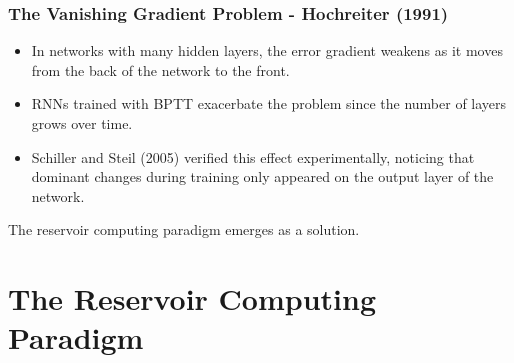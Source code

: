 \documentclass{beamer}
\begin{document}

\begin{frame}
\frametitle{The Vanishing Gradient Problem - Hochreiter (1991)}

\begin{itemize}
\item In networks with many hidden layers, the error gradient weakens as it moves from the back of the network to the front.
\item RNNs trained with BPTT exacerbate the problem since the number of layers grows over time.
\item Schiller and Steil (2005) verified this effect experimentally, noticing that dominant changes during training only appeared on the output layer of the network.
\end{itemize}

\begin{center}
The reservoir computing paradigm emerges as a solution.
\end{center}

\end{frame}


\section{The Reservoir Computing Paradigm}
\end{document}
